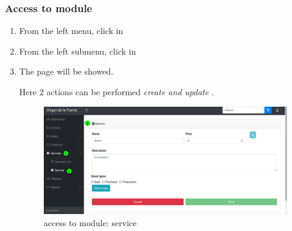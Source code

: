 \documentclass[a4paper,11pt]{refart}
\begin{document}
\subsubsection{Access to module}
\begin{enumerate}
	\item From the left menu, click in 
	\item From the left submenu, click in 
	\item The page will be showed.
	\medskip
	\begin{leftbar}
		Here 2 actions can be performed \emph{create and update} .
	\end{leftbar}
	\begin{figure}[H]\centering
		\includegraphics[width=\textwidth]{images/service_form-access.png}
		\caption{access to module: service}
		\label{fig:service_form-access.png}
	\end{figure}
\end{enumerate}

\end{document}
